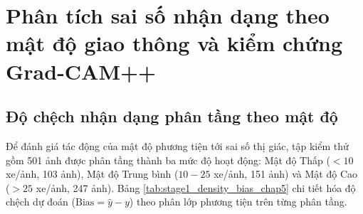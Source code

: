 \section{Phân tích sai số nhận dạng theo mật độ giao thông và kiểm chứng Grad-CAM++}
\label{sec:phan_tich_sai_so_theo_mat_do}

\subsection{Độ chệch nhận dạng phân tầng theo mật độ}
Để đánh giá tác động của mật độ phương tiện tới sai số thị giác, tập kiểm thử gồm 501 ảnh được phân tầng thành ba mức độ hoạt động: Mật độ Thấp ($<10$ xe/ảnh, 103 ảnh), Mật độ Trung bình ($10-25$ xe/ảnh, 151 ảnh) và Mật độ Cao ($>25$ xe/ảnh, 247 ảnh). Bảng \ref{tab:stage1_density_bias_chap5} chi tiết hóa độ chệch dự đoán ($\text{Bias} = \hat{y} - y$) theo phân lớp phương tiện trên từng phân tầng.

\begin{table}[htbp]
\centering
\caption{Độ chệch nhận dạng Stage 1 phân tầng theo mật độ giao thông ($\text{Mean} \pm \text{Std}$).}
\label{tab:stage1_density_bias_chap5}
\small
{}
\end{table}

